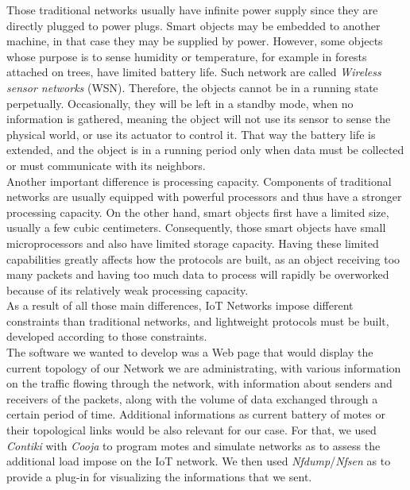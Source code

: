 Those traditional networks usually have infinite power supply since they are directly plugged to power plugs. Smart objects may be embedded to another machine, in that case they may be supplied by power. However, some objects whose purpose is to sense humidity or temperature, for example in forests attached on trees, have limited battery life.  Such network are called \textit{Wireless sensor networks} (WSN). Therefore, the objects cannot be in a running state perpetually. Occasionally, they will be left in a standby mode, when no information is gathered, meaning the object will not use its sensor to sense the physical world, or use its actuator to control it. That way the battery life is extended, and the object is in a running period only when data must be collected or must communicate with its neighbors. \\

Another important difference is processing capacity. Components of traditional networks are usually equipped with powerful processors and thus have a stronger processing capacity. On the other hand, smart objects first have a limited size, usually a few cubic centimeters. Consequently, those smart objects have small microprocessors and also have limited storage capacity. Having these limited capabilities greatly affects how the protocols are built, as an object receiving too many packets and having too much data to process will rapidly be overworked because of its relatively weak processing capacity. \\

As a result of all those main differences, IoT Networks impose different constraints than traditional networks, and lightweight protocols must be built, developed according to those constraints.\\

The software we wanted to develop was a Web page that would display the current topology of our Network we are administrating, with various information on the traffic flowing through the network, with information about senders and receivers of the packets, along with the volume of data exchanged through a certain period of time. Additional informations as current battery of motes or their topological links would be also relevant for our case. For that, we used \textit{Contiki} with \textit{Cooja} to program motes and simulate networks as to assess the additional load impose on the IoT network. We then used \textit{Nfdump}/\textit{Nfsen} as to provide a plug-in for visualizing the informations that we sent.
